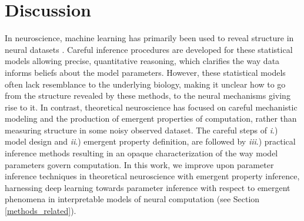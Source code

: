 \documentclass[11pt]{article}
\begin{document}
%

\section{Discussion} 
In neuroscience, machine learning has primarily been used to reveal structure in neural datasets \cite{paninski2018neural}.
Careful inference procedures are developed for these statistical models allowing precise, quantitative reasoning, which clarifies the way data informs beliefs about the model parameters.  
However, these statistical models often lack resemblance to the underlying biology, making it unclear how to go from the structure revealed by these methods, to the neural mechanisms giving rise to it. 
In contrast, theoretical neuroscience has focused on careful mechanistic modeling and the production of emergent properties of computation, rather than measuring structure in some noisy observed dataset.
The careful steps of \emph{i}.) model design and \emph{ii}.) emergent property definition, are followed by \emph{iii}.) practical inference methods resulting in an opaque characterization of the way model parameters govern computation.  
In this work, we improve upon parameter inference techniques in theoretical neuroscience with emergent property inference, harnessing deep learning towards parameter inference with respect to emergent phenomena in  interpretable models of neural computation (see Section \ref{methods_related}).
\end{document}
